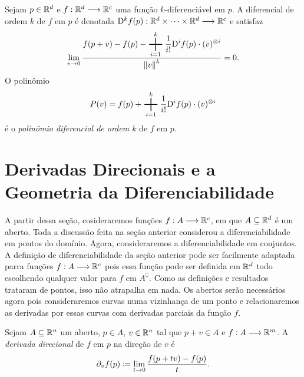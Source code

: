 \begin{nota}
Sejam $p \in \mathbb{R}^d$ e $f: \mathbb{R}^d \longrightarrow \mathbb{R}^c$ uma função $k$-diferenciável em $p$. A diferencial de ordem $k$ de $f$ em $p$ é denotada $\mathrm{D}^k f(p): \mathbb{R}^d \times \cdots \times \mathbb{R}^d \longrightarrow \mathbb{R}^c$ e satisfaz
	\begin{equation*}
	\lim_{v \conv 0} \frac{\displaystyle f(p+v) - f(p) - \bigplus_{i=1}^k \frac{1}{i!}\D^i f(p) \cdot (v)^{\otimes i}}{\nor{v}^k} = 0.
	\end{equation*}
O polinômio
	\begin{equation*}
	P(v) = f(p) + \bigplus_{i=1}^k \frac{1}{i!}\D^i f(p) \cdot (v)^{\otimes i}
	\end{equation*}
é o \emph{polinômio diferencial de ordem $k$} de $f$ em $p$.
\end{nota}

\section{Derivadas Direcionais e a Geometria da Diferenciabilidade}

A partir dessa seção, cosideraremos funções $f: A \longrightarrow \mathbb{R}^c$, em que $A \subseteq \mathbb{R}^d$ é um aberto. Toda a discussão feita na seção anterior considerou a diferenciabilidade em pontos do domínio. Agora, consideraremos a diferenciabilidade em conjuntos. A definição de diferenciabilidade da seção anterior pode ser facilmente adaptada parra funções $f: A \longrightarrow \mathbb{R}^c$ pois essa função pode ser definida em $\mathbb{R}^d$ todo escolhendo qualquer valor para $f$ em $A^\complement$. Como as definições e resultados trataram de pontos, isso não atrapalha em nada. Os abertos serão necessários agora pois consideraremos curvas numa vizinhança de um ponto e relacionaremos as derivadas por essas curvas com derivadas parciais da função $f$.

\begin{defi}
Sejam $A \subseteq \mathbb{R}^n$ um aberto, $p \in A$, $v \in \mathbb{R}^n$ tal que $p+v \in A$ e $f: A \longrightarrow \mathbb{R}^m$. A \emph{derivada direcional} de $f$ em $p$ na direção de $v$ é
	\begin{equation*}
	\partial_v f(p) \coloneqq \lim_{t \rightarrow 0} \frac{f(p+tv)-f(p)}{t}.
	\end{equation*}
\end{defi}

